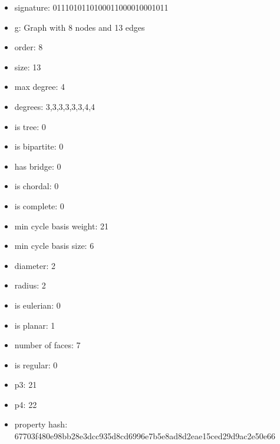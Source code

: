 \begin{itemize}
\item signature: 0111010110100011000010001011
\item g: Graph with 8 nodes and 13 edges
\item order: 8
\item size: 13
\item max degree: 4
\item degrees: 3,3,3,3,3,3,4,4
\item is tree: 0
\item is bipartite: 0
\item has bridge: 0
\item is chordal: 0
\item is complete: 0
\item min cycle basis weight: 21
\item min cycle basis size: 6
\item diameter: 2
\item radius: 2
\item is eulerian: 0
\item is planar: 1
\item number of faces: 7
\item is regular: 0
\item p3: 21
\item p4: 22
\item property hash: 67703f480e98bb28e3dcc935d8cd6996e7b5e8ad8d2eae15ced29d9ac2e50e66
\end{itemize}
\newpage
\begin{figure}
\end{figure}
